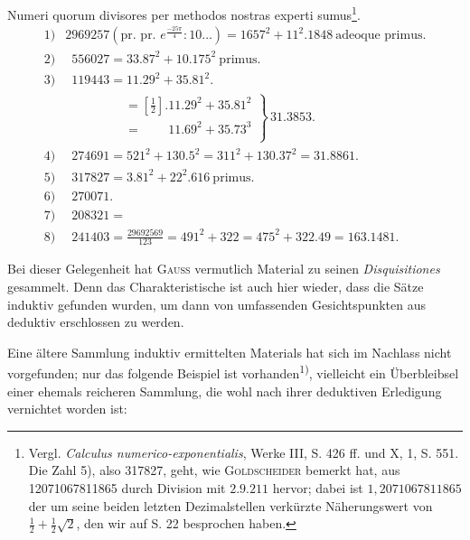 Numeri quorum divisores per methodos nostras experti sumus\footnote{Vergl. \textit{Calculus numerico-exponentialis}, Werke III, S. 426 ff. und X, 1, S. 551. Die Zahl 5), also 317827, geht, wie \textsc{Goldscheider} bemerkt hat, aus 12071067811865 durch Division mit $2\mathord{.}9\mathord{.}211$ hervor; dabei ist $1{,}2071067811865$ der um seine beiden letzten Dezimalstellen verkürzte Näherungswert von $\frac12+\frac12\sqrt2$, den wir auf S. 22 besprochen haben.}.
\begingroup\footnotesize\setlength{\arraycolsep}{3pt}
\[
\begin{array}{rl}
1)&2969257\left(\text{pr. pr. }e^{\frac{-25\pi}{4}}:10\ldots\right)=1657^2+11^2\mathord{.}1848\ \text{adeoque primus.}\\
2)&\phantom{2}556027=33\mathord{.}87^2+10\mathord{.}175^2\ \text{primus.}\\
3)&\phantom{2}119443=11\mathord{.}29^2+35\mathord{.}81^2.\\
&\phantom{2119443}\left.\begin{aligned}
&=\left[\tfrac12\right]\mathord{.}11\mathord{.}29^2+35\mathord{.}81^2\\
&=\phantom{\left[\tfrac12\right]\mathord{.}}11\mathord{.}69^2+35\mathord{.}73^3
\end{aligned}\right\}\,31\mathord{.}3853.\\
4)&\phantom{2}274691=521^2+130\mathord{.}5^2=311^2+130\mathord{.}37^2=31\mathord{.}8861.\\
5)&\phantom{2}317827=3\mathord{.}81^2+22^2\mathord{.}616\ \text{primus.}\\
6)&\phantom{2}270071.\\
7)&\phantom{2}208321=\\
8)&\phantom{2}241403=\frac{29692569}{123}=491^2+322=475^2+322\mathord{.}49=163\mathord{.}1481.
\end{array}
\]
\endgroup
\par\noindent\hspace*{\parindent}Bei dieser Gelegenheit hat \textsc{Gauss} vermutlich Material zu seinen \textit{Disquisitiones} gesammelt. Denn das Charakteristische ist auch hier wieder, dass die
Sätze induktiv gefunden wurden, um dann von umfassenden Gesichtspunkten
aus deduktiv erschlossen zu werden.

Eine ältere Sammlung induktiv ermittelten Materials hat sich im Nachlass nicht vorgefunden; nur das folgende Beispiel ist vorhanden\textsuperscript{1)}, vielleicht
\clearpage{}
\noindent ein Überbleibsel einer ehemals reicheren Sammlung, die wohl nach ihrer deduktiven Erledigung vernichtet worden ist:

